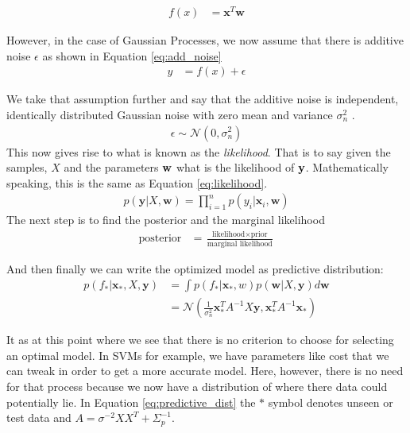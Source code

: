 \documentclass[11pt, twoside]{article}   	%
\begin{document}
\begin{align}
f(x) &= \mathbf{x}^T\mathbf{w}\label{eq:linear_eq}
\end{align}

However, in the case of Gaussian Processes, we now assume that there is additive noise 
$\epsilon$ as shown in Equation \ref{eq:add_noise}
\begin{align}
y &= f(x) + \epsilon \label{eq:add_noise}
\end{align}

We take that assumption further and say that the additive noise is independent, 
identically distributed Gaussian noise with zero mean and variance $\sigma^2_n$ \cite{gauss_proc}.
\begin{align}
\epsilon \sim  \mathcal{N}(0, \sigma^2_n) \label{eq:guass_zero}
\end{align}
This now gives rise to what is known as the \textit{likelihood}. That is to say 
given the samples, $X$ and the parameters $\bf{w}$ what is the likelihood
of $\bf{y}$. Mathematically speaking, this is the same as Equation \ref{eq:likelihood}. 
\begin{align}
p(\mathbf{y}|X,\mathbf{w}) = \prod^n_{i=1}p(y_i|\mathbf{x}_i, \mathbf{w})\label{eq:likelihood}
\end{align}
The next step is to find the posterior and the marginal likelihood
\begin{align}
\text{posterior} &= \frac{\text{likelihood} \times \text{prior}}{\text{marginal likelihood}}
\end{align}

And then finally we can write the optimized model as predictive distribution:
\begin{align}
p(f_*|\mathbf{x}_*, X, \mathbf{y}) &= \int p(f_* |\mathbf{x}_*, w)p(\mathbf{w}|X, \mathbf{y})d\mathbf{w} \\
&= \mathcal{N}(\frac{1}{\sigma^2_n} \mathbf{x}_*^TA^{-1} X \mathbf{y}, \mathbf{x}_*^T A^{-1} \mathbf{x}_*)
\label{eq:predictive_dist}
\end{align}


It as at this point where we see that there is no criterion to choose for selecting an optimal model. 
In SVMs for example, we have parameters like cost that we can tweak in order to get a more accurate model. 
Here, however, there is no need for that process because we now have a distribution of where
there data could potentially lie. In Equation \ref{eq:predictive_dist} the $*$ symbol denotes unseen
 or test data and $A = \sigma^{-2}XX^T + \Sigma_p^{-1}$.
\end{document}

